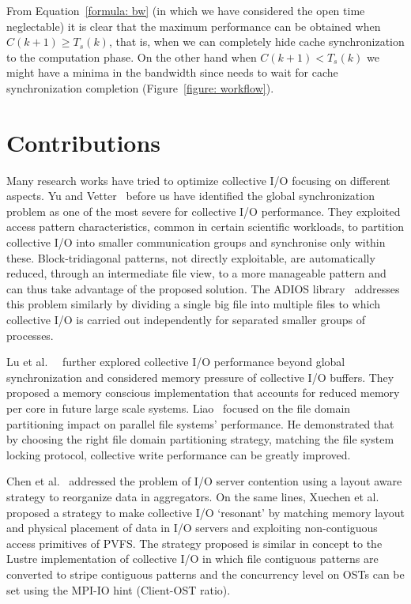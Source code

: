 From Equation~\ref{formula: bw} (in which we have considered the open time neglectable) it is clear that the maximum performance can be obtained when $C(k+1) \geq T_s(k)$, that is, when we can completely hide 
cache synchronization to the computation phase. On the other hand when $C(k+1) < T_s(k)$ we might have a minima in the bandwidth since  needs to wait for cache synchronization 
completion (Figure~\ref{figure: workflow}). 

\section{Contributions} \label{sec: nvm-related}
Many research works have tried to optimize collective I/O focusing on different aspects. Yu and Vetter~\cite{Yu08} before us have identified the global synchronization 
problem as one of the most severe for collective I/O performance. They exploited access pattern characteristics, common in certain scientific workloads, to partition collective 
I/O into smaller communication groups and synchronise only within these. Block-tridiagonal patterns, not directly exploitable, are automatically reduced, through an intermediate 
file view, to a more manageable pattern and can thus take advantage of the proposed solution. The ADIOS library~\cite{Lofstead2008} addresses this problem similarly by dividing a 
single big file into multiple files to which collective I/O is carried out independently for separated smaller groups of processes. 

Lu et al.~\cite{Lu2012}~\cite{Lu2013} further explored collective I/O performance beyond global synchronization and considered memory pressure of collective I/O buffers. They proposed 
a memory conscious implementation that accounts for reduced memory per core in future large scale systems. Liao~\cite{Liao11} focused on the file domain partitioning impact on parallel 
file systems' performance. He demonstrated that by choosing the right file domain partitioning strategy, matching the file system locking protocol, collective write performance can be 
greatly improved.

Chen et al.~\cite{Chen2011} addressed the problem of I/O server contention using a layout aware strategy to reorganize data in aggregators. On the same lines, 
Xuechen et al.~\cite{Zhang2009} proposed a strategy to make collective I/O `resonant' by matching memory layout and physical placement of data in I/O servers and exploiting 
non-contiguous access primitives of PVFS. The strategy proposed is similar in concept to the Lustre implementation of collective I/O in which file contiguous patterns are converted to 
stripe contiguous patterns and the concurrency level on OSTs can be set using the MPI-IO hint  (Client-OST ratio). 


